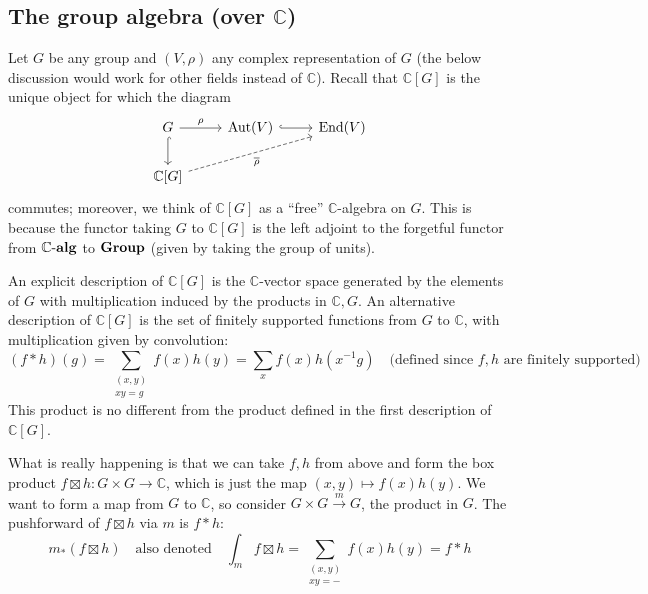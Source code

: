 \documentclass[../../rtnotes.tex]{subfiles}
\begin{document}
\subsection{The group algebra (over $\mathbb C$)}
Let $G$ be any group and $(V,\rho)$ any complex representation of $G$ (the below discussion would work for other fields instead of $\mathbb C$). Recall that $\mathbb C[G]$ is the unique object for which the diagram 
\[\begin{tikzcd}[ampersand replacement=\&]
	G \& {\Aut(V)} \& {\End(V)} \\
	{\mathbb C[G]}
	\arrow["\rho", from=1-1, to=1-2]
	\arrow[hook, from=1-1, to=2-1]
	\arrow[hook, from=1-2, to=1-3]
	\arrow["{\overline\rho}"', dashed, from=2-1, to=1-3]
\end{tikzcd}\]
commutes; moreover, we think of $\mathbb C[G]$ as a ``free'' $\mathbb C$-algebra on $G$. This is because the functor taking $G$ to $\mathbb C[G]$ is the left adjoint to the forgetful functor from $\mathbb C\text{-}{\normalfont\mathbf{alg}}$ to ${\normalfont\mathbf{Group}}$ (given by taking the group of units).

An explicit description of $\mathbb C[G]$ is the $\mathbb C$-vector space generated by the elements of $G$ with multiplication induced by the products in $\mathbb C, G$. An alternative description of $\mathbb C[G]$ is the set of finitely supported functions from $G$ to $\mathbb C$, with multiplication given by convolution:
\[(f\ast h)(g) = \sum_{\substack{(x,y)\\xy=g}}f(x)h(y) = \sum_{x}f(x)h(x^{-1}g)\quad\text{(defined since $f,h$ are finitely supported)}\]
This product is no different from the product defined in the first description of $\mathbb C[G]$.

What is really happening is that we can take $f,h$ from above and form the box product $f\boxtimes h\colon G\times G \to \mathbb C$, which is just the map $(x,y)\mapsto f(x)h(y)$. We want to form a map from $G$ to $\mathbb C$, so consider $G\times G\xrightarrow{m}G$, the product in $G$. The pushforward of $f\boxtimes h$ via $m$ is $f\ast h$:
\[m_\ast(f\boxtimes h) \quad\text{also denoted}\quad \int_mf\boxtimes h = \sum_{{\substack{(x,y)\\xy=-}}}f(x)h(y) = f\ast h\]
\end{document}

